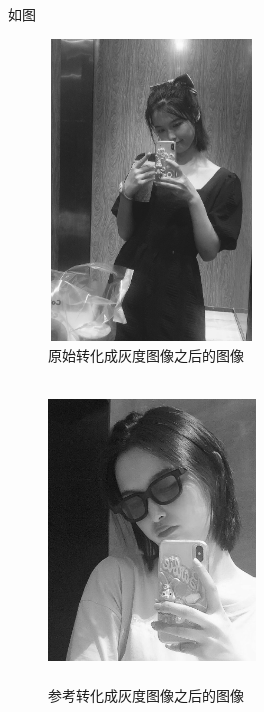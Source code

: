 \documentclass{article}
\begin{document}
  如图
  \begin{figure}[h!]
                \centering
                \includegraphics[width=5.5cm,height=8cm]{xuan10.png}
                \caption{原始转化成灰度图像之后的图像}
                \end{figure}
  \begin{figure}[h!]
                \centering
                \includegraphics[width=5.5cm,height=8cm]{xuan11.png}
                \caption{参考转化成灰度图像之后的图像}
                \end{figure}
\end{document}
